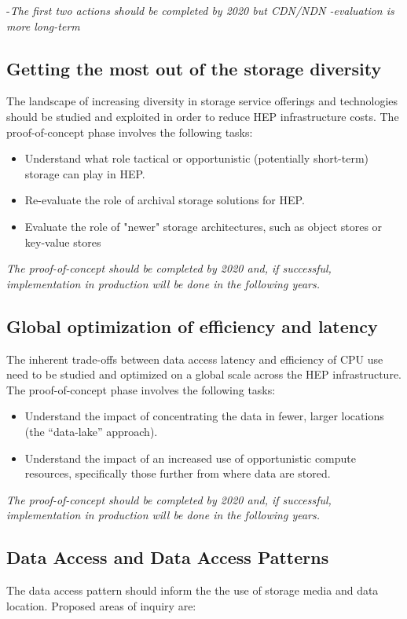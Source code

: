 \documentclass[12pt,a4paper]{article}
\begin{document}
-\emph{The first two actions should be completed by 2020 but CDN/NDN
-evaluation is more long-term}

\subsection{Getting the most out of the
storage diversity}\label{storage-diversity}

The landscape of increasing diversity in storage service offerings and technologies should be studied and
exploited in order to reduce HEP infrastructure costs. The proof-of-concept phase involves the following tasks:

\begin{itemize}
\item Understand what role tactical or opportunistic (potentially short-term) storage can play in HEP.
\item Re-evaluate the role of archival storage solutions for HEP.
\item Evaluate the role of "newer" storage architectures, such as object stores or key-value stores
\end{itemize}

\emph{The  proof-of-concept should be completed by 2020 and, if successful, implementation in
production will be done in the following years.}

\subsection{Global optimization of efficiency and latency}\label{efficiency-latency}
The inherent trade-offs between data access latency and efficiency of CPU use need to be studied and optimized
on a global scale across the HEP infrastructure. The proof-of-concept phase involves the following tasks:

\begin{itemize}
\item Understand the impact of concentrating the
  data in fewer, larger locations (the ``data-lake'' approach).
\item Understand the impact of an increased use of
  opportunistic compute resources, specifically those further from where data are stored.
\end{itemize}

\emph{The  proof-of-concept should be completed by 2020 and, if successful, implementation in
production will be done in the following years.}

\subsection{Data Access and Data Access Patterns}\label{access-patterns}
The data access pattern should inform the the use of storage media and data location. Proposed areas of inquiry are:
\end{document}
